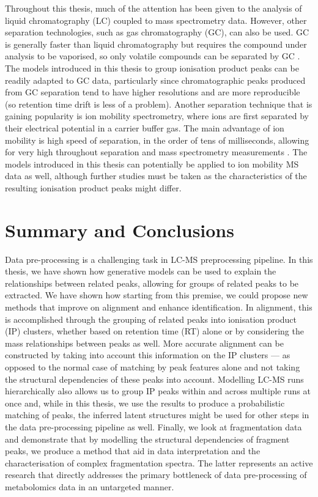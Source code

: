 Throughout this thesis, much of the attention has been given to the analysis of liquid chromatography (LC) coupled to mass spectrometry data. However, other separation technologies, such as gas chromatography (GC), can also be used. GC is generally faster than liquid chromatography but requires the compound under analysis to be vaporised, so only volatile compounds can be separated by GC \cite{gross2006mass}. The models introduced in this thesis to group ionisation product peaks can be readily adapted to GC data, particularly since chromatographic peaks produced from GC separation tend to have higher resolutions and are more reproducible (so retention time drift is less of a problem). Another separation technique that is gaining popularity is ion mobility spectrometry, where ions are first separated by their electrical potential in a carrier buffer gas. The main advantage of ion mobility is high speed of separation, in the order of tens of milliseconds, allowing for very high throughout separation and mass spectrometry measurements \cite{mclean2005ion}. The models introduced in this thesis can potentially be applied to ion mobility MS data as well, although further studies must be taken as the characteristics of the resulting ionisation product peaks might differ.

\section{Summary and Conclusions}

Data pre-processing is a challenging task in LC-MS preprocessing pipeline. In this thesis, we have shown how generative models can be used to explain the relationships between related peaks, allowing for groups of related peaks to be extracted. We have shown how starting from this premise, we could propose new methods that improve on alignment and enhance identification. In alignment, this is accomplished through the grouping of related peaks into ionisation product (IP) clusters, whether based on retention time (RT) alone or by considering the mass relationships between peaks as well. More accurate alignment can be constructed by taking into account this information on the IP clusters --- as opposed to the normal case of matching by peak features alone and not taking the structural dependencies of these peaks into account. Modelling LC-MS runs hierarchically also allows us to group IP peaks within and across multiple runs at once and, while in this thesis, we use the results to produce a probabilistic matching of peaks, the inferred latent structures might be used for other steps in the data pre-processing pipeline as well. Finally, we look at fragmentation data and demonstrate that by modelling the structural dependencies of fragment peaks, we produce a method that aid in data interpretation and the characterisation of complex fragmentation spectra. The latter represents an active research that directly addresses the primary bottleneck of data pre-processing of metabolomics data in an untargeted manner.

